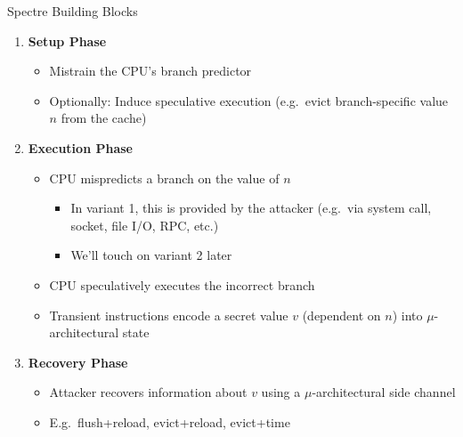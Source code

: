 \documentclass[10pt, dvipsnames, aspectratio=169]{beamer}
\begin{document}
\begin{frame}[c]{Spectre Building Blocks}
  \begin{enumerate}
    \item {\bf\color{blue}Setup Phase}
    \begin{itemize}
      \item Mistrain the CPU's branch predictor
      \item Optionally: Induce speculative execution (e.g.~evict branch-specific value $n$ from the cache)
    \end{itemize}

    \vfill
    \item {\bf\color{orange}Execution Phase}
    \begin{itemize}
      \item CPU mispredicts a branch on the value of $n$
      \begin{itemize}
        \item In variant 1, this is provided by the attacker (e.g.~via system call, socket, file I/O, RPC, etc.)
        \item We'll touch on variant 2 later
      \end{itemize}
      \item CPU speculatively executes the incorrect branch
      \item Transient instructions encode a secret value $v$ (dependent on $n$) into $\mu$-architectural state
    \end{itemize}

    \vfill
    \item {\bf\color{green}Recovery Phase}
    \begin{itemize}
      \item Attacker recovers information about $v$ using a $\mu$-architectural side channel
      \item E.g.~flush+reload, evict+reload, evict+time
    \end{itemize}
  \end{enumerate}
\end{frame}
\end{document}
